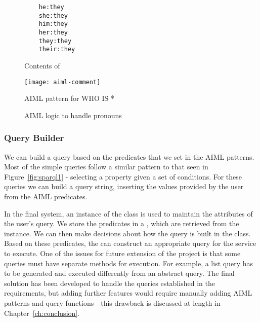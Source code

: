 \begin{figure}[h]
	\centering
	\begin{lstlisting}
	he:they
	she:they
	him:they
	her:they
	they:they
	their:they
	\end{lstlisting}
	\caption{Contents of }
	\label{fig:pronouns}
\end{figure}

\begin{figure}[pt]
	\centering
	\texttt{[image: aiml-comment]}
	\caption{AIML pattern for WHO IS *}
	\label{fig:aiml-comment}
	\qquad
	\caption{AIML logic to handle pronouns}
	\label{fig:aiml-pronouns}
\end{figure}

\newpage
\subsubsection{Query Builder}
We can build a query based on the predicates that we set in the AIML patterns. Most of the simple queries follow a similar pattern to that seen in Figure~\ref{fig:sparql1} - selecting a property given a set of conditions. For these queries we can build a query string, inserting the values provided by the user from the AIML predicates.

In the final system, an instance of the  class is used to maintain the attributes of the user's query. We store the predicates in a , which are retrieved from the  instance. We can then make decisions about how the query is built in the  class. Based on these predicates, the  can construct an appropriate query for the  service to execute. One of the issues for future extension of the project is that some queries must have separate methods for execution. For example, a list query has to be generated and executed differently from an abstract query. The final solution has been developed to handle the queries established in the requirements, but adding further features would require manually adding AIML patterns and query functions - this drawback is discussed at length in Chapter~\ref{ch:conclusion}.

